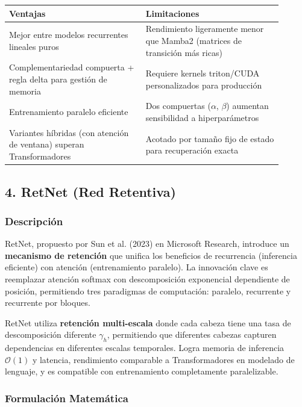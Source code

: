 \documentclass[11pt,a4paper]{article}
\begin{document}
\begin{table}[h]
\centering
\begin{tabular}{|p{0.45\linewidth}|p{0.45\linewidth}|}
\hline
\textbf{Ventajas} & \textbf{Limitaciones} \\
\hline
Mejor entre modelos recurrentes lineales puros & Rendimiento ligeramente menor que Mamba2 (matrices de transición más ricas) \\
\hline
Complementariedad compuerta + regla delta para gestión de memoria & Requiere kernels triton/CUDA personalizados para producción \\
\hline
Entrenamiento paralelo eficiente & Dos compuertas ($\alpha$, $\beta$) aumentan sensibilidad a hiperparámetros \\
\hline
Variantes híbridas (con atención de ventana) superan Transformadores & Acotado por tamaño fijo de estado para recuperación exacta \\
\hline
\end{tabular}
\end{table}

\subsection{4. RetNet (Red Retentiva)}

\subsubsection{Descripción}

RetNet, propuesto por Sun et al. (2023) en Microsoft Research, introduce un \textbf{mecanismo de retención} que unifica los beneficios de recurrencia (inferencia eficiente) con atención (entrenamiento paralelo). La innovación clave es reemplazar atención softmax con descomposición exponencial dependiente de posición, permitiendo tres paradigmas de computación: paralelo, recurrente y recurrente por bloques.

RetNet utiliza \textbf{retención multi-escala} donde cada cabeza tiene una tasa de descomposición diferente $\gamma_h$, permitiendo que diferentes cabezas capturen dependencias en diferentes escalas temporales. Logra memoria de inferencia $\mathcal{O}(1)$ y latencia, rendimiento comparable a Transformadores en modelado de lenguaje, y es compatible con entrenamiento completamente paralelizable.

\subsubsection{Formulación Matemática}
\end{document}
